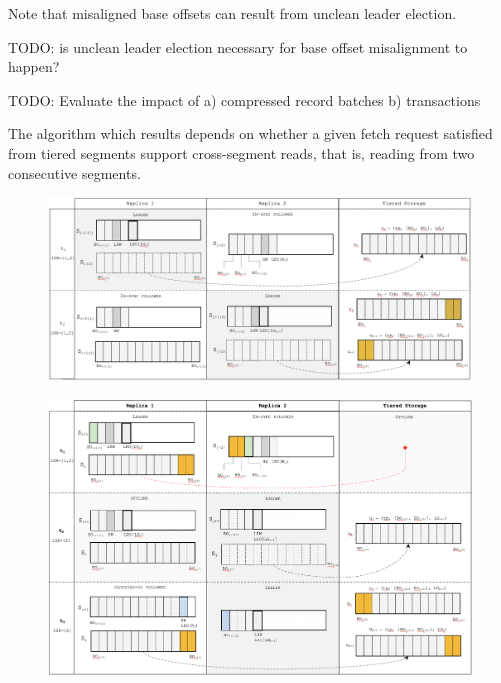 \documentclass{article}
\begin{document}
Note that misaligned base offsets can result from unclean leader election.

TODO: is unclean leader election necessary for base offset misalignment to happen?

TODO: Evaluate the impact of a) compressed record batches b) transactions

The algorithm which results depends on whether a given fetch request satisfied from tiered segments support cross-segment reads, that is, reading from two consecutive segments. 

\begin{figure}[h!]
	\includegraphics[scale=0.4]{img/left-overlap.png}
	\label{fig:left-overlap}
\end{figure}

\begin{figure}[h!]
	\includegraphics[scale=0.4]{img/right-overlap.png}
	\label{fig:right-overlap}
\end{figure}
\end{document}
